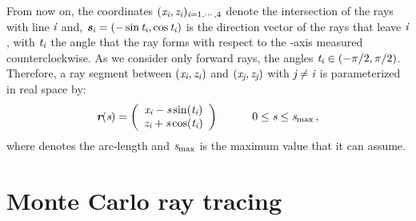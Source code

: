 From now on, the coordinates $(\textit{x}_{\textit{i}}, \textit{z}_{\textit{i}})_{\textit{i} =1, \cdots, 4}$ denote the intersection of the rays with line $\textit{i}$ and,
$\textit{\textbf{s}}_{\textit{i}}= (-\sin \textit{t}_{\textit{i}}, \cos \textit{t}_{\textit{i}})$ is the direction vector of the rays that leave $\textit{i}$,
 with $\textit{t}_{\textit{i}}$ the angle that the ray forms with respect to the -axis measured counterclockwise. As we consider only forward rays, the angles $\textit{t}_{\textit{i}}\in (-\pi/2, \pi/2)$.
 Therefore, a ray segment between $(\textit{x}_{\textit{i}}, \textit{z}_{\textit{i}})$ and $(\textit{x}_{\textit{j}}, \textit{z}_{\textit{j}})$ 
 with $\textit{j}\neq\textit{i}$ is parameterized in real space by:
\begin{equation}
\label{parametrization}
\textit{\textbf{r}}(\textit{s})=
\left( \begin{array}{cc}
\textit{x}_{\textit{i}}-\textit{s}\sin(\textit{t}_{\textit{i}}) \\
\textit{z}_{\textit{i}}+\textit{s}\cos(\textit{t}_{\textit{i}})\end{array} \right) \qquad \quad 0\leq \textit{s}\leq \textit{s}_{\textrm{max}}\,,
\end{equation}
where  denotes the arc-length and $\textit{s}_{\textrm{max}}$ is the maximum value that it can assume.
\section{Monte Carlo ray tracing}


